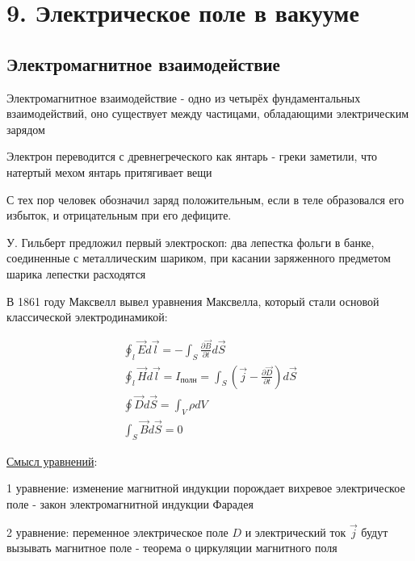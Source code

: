 \documentclass[12pt]{article}
\begin{document}
    \section{9. Электрическое поле в вакууме}

    \subsection{Электромагнитное взаимодействие}

    Электромагнитное взаимодействие - одно из четырёх фундаментальных взаимодействий, 
    оно существует между частицами, обладающими электрическим зарядом

    Электрон переводится с древнегреческого как янтарь - греки заметили, что натертый мехом янтарь притягивает вещи

    С тех пор человек обозначил заряд положительным, если в теле образовался его избыток, и отрицательным при его дефиците.

    У. Гильберт предложил первый электроскоп: два лепестка фольги в банке, соединенные с металлическим шариком,
    при касании заряженного предметом шарика лепестки расходятся

    В 1861 году Максвелл вывел уравнения Максвелла, который стали основой классической электродинамикой:

    \begin{tcolorbox}[title=Уравнения Максвелла, colframe=green!25, colback=green!10, coltitle=black]
        \begin{gather*}
            \oint_l \vec{E} d\vec{l} = -\int_S \frac{\partial \vec{B}}{\partial t} d\vec{S}\\
            \oint_l \vec{H} d\vec{l} = I_{\text{полн}} = \int_S (\vec{j} - \frac{\partial \vec{D}}{\partial t}) d\vec{S}\\
            \oint \vec{D} d\vec{S} = \int_V \rho dV\\
            \int_S \vec{B} d\vec{S} = 0
        \end{gather*}
    \end{tcolorbox}

    \underline{Смысл уравнений}:

    1 уравнение: изменение магнитной индукции порождает вихревое электрическое поле - закон электромагнитной индукции Фарадея

    2 уравнение: переменное электрическое поле $D$ и электрический ток $\vec{j}$ будут вызывать магнитное поле - теорема о циркуляции магнитного поля
\end{document}
